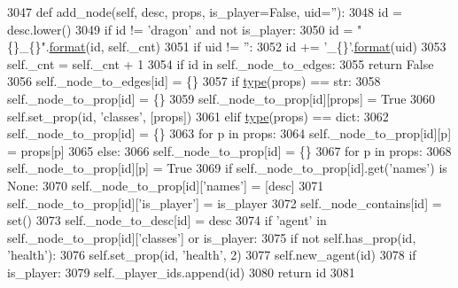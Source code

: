 \begin{DoxyCode}
3047     \textcolor{keyword}{def }add\_node(self, desc, props, is\_player=False, uid=''):
3048         id = desc.lower()
3049         \textcolor{keywordflow}{if} id != \textcolor{stringliteral}{'dragon'} \textcolor{keywordflow}{and} \textcolor{keywordflow}{not} is\_player:
3050             id = \textcolor{stringliteral}{"\{\}\_\{\}"}.\hyperlink{namespaceparlai_1_1chat__service_1_1services_1_1messenger_1_1shared__utils_a32e2e2022b824fbaf80c747160b52a76}{format}(id, self.\_cnt)
3051             \textcolor{keywordflow}{if} uid != \textcolor{stringliteral}{''}:
3052                 id += \textcolor{stringliteral}{'\_\{\}'}.\hyperlink{namespaceparlai_1_1chat__service_1_1services_1_1messenger_1_1shared__utils_a32e2e2022b824fbaf80c747160b52a76}{format}(uid)
3053         self.\_cnt = self.\_cnt + 1
3054         \textcolor{keywordflow}{if} id \textcolor{keywordflow}{in} self.\_node\_to\_edges:
3055             \textcolor{keywordflow}{return} \textcolor{keyword}{False}
3056         self.\_node\_to\_edges[id] = \{\}
3057         \textcolor{keywordflow}{if} \hyperlink{namespaceparlai_1_1agents_1_1tfidf__retriever_1_1build__tfidf_ad5dfae268e23f506da084a9efb72f619}{type}(props) == str:
3058             self.\_node\_to\_prop[id] = \{\}
3059             self.\_node\_to\_prop[id][props] = \textcolor{keyword}{True}
3060             self.set\_prop(id, \textcolor{stringliteral}{'classes'}, [props])
3061         \textcolor{keywordflow}{elif} \hyperlink{namespaceparlai_1_1agents_1_1tfidf__retriever_1_1build__tfidf_ad5dfae268e23f506da084a9efb72f619}{type}(props) == dict:
3062             self.\_node\_to\_prop[id] = \{\}
3063             \textcolor{keywordflow}{for} p \textcolor{keywordflow}{in} props:
3064                 self.\_node\_to\_prop[id][p] = props[p]
3065         \textcolor{keywordflow}{else}:
3066             self.\_node\_to\_prop[id] = \{\}
3067             \textcolor{keywordflow}{for} p \textcolor{keywordflow}{in} props:
3068                 self.\_node\_to\_prop[id][p] = \textcolor{keyword}{True}
3069         \textcolor{keywordflow}{if} self.\_node\_to\_prop[id].get(\textcolor{stringliteral}{'names'}) \textcolor{keywordflow}{is} \textcolor{keywordtype}{None}:
3070             self.\_node\_to\_prop[id][\textcolor{stringliteral}{'names'}] = [desc]
3071         self.\_node\_to\_prop[id][\textcolor{stringliteral}{'is\_player'}] = is\_player
3072         self.\_node\_contains[id] = set()
3073         self.\_node\_to\_desc[id] = desc
3074         \textcolor{keywordflow}{if} \textcolor{stringliteral}{'agent'} \textcolor{keywordflow}{in} self.\_node\_to\_prop[id][\textcolor{stringliteral}{'classes'}] \textcolor{keywordflow}{or} is\_player:
3075             \textcolor{keywordflow}{if} \textcolor{keywordflow}{not} self.has\_prop(id, \textcolor{stringliteral}{'health'}):
3076                 self.set\_prop(id, \textcolor{stringliteral}{'health'}, 2)
3077             self.new\_agent(id)
3078         \textcolor{keywordflow}{if} is\_player:
3079             self.\_player\_ids.append(id)
3080         \textcolor{keywordflow}{return} id
3081 
\end{DoxyCode}
